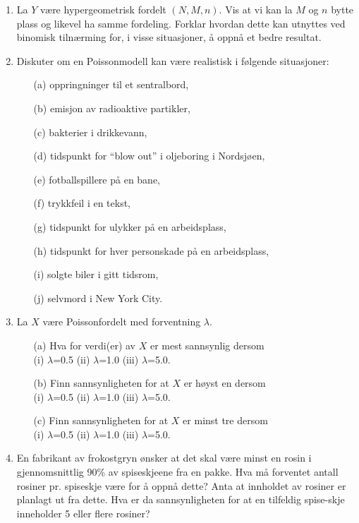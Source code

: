 \begin{enumerate}
\item  La $Y$ være hypergeometrisk fordelt $(N,M,n)$. Vis at vi kan
     la $M$ og $n$ bytte plass og likevel ha samme fordeling.
     Forklar hvordan dette kan utnyttes ved binomisk tilnærming
     for, i visse situasjoner, å oppnå et bedre resultat.


\item  Diskuter om en Poissonmodell kan være realistisk i
     følgende situasjoner:
     \begin{itemize}
     \item[(a)]  oppringninger til et sentralbord,
     \item[(b)]  emisjon av radioaktive partikler,
     \item[(c)]  bakterier i drikkevann,
     \item[(d)]  tidspunkt for ``blow out'' i oljeboring i Nordsjøen,
     \item[(e)]  fotballspillere på en bane,
     \item[(f)]  trykkfeil i en tekst,
     \item[(g)]  tidspunkt for ulykker på en arbeidsplass,
     \item[(h)]  tidspunkt for hver personskade på en arbeidsplass,
     \item[(i)]  solgte biler i gitt tidsrom,
     \item[(j)]  selvmord i New York City.
     \end{itemize}

\item  La $X$ være Poissonfordelt med forventning $\lambda$.
     \begin{itemize}
     \item[(a)]  Hva for verdi(er) av $X$ er mest sannsynlig dersom \\
          (i) $\lambda$=0.5 (ii) $\lambda$=1.0 (iii) $\lambda$=5.0.
     \item[(b)]  Finn sannsynligheten for at $X$ er høyst en dersom \\
          (i) $\lambda$=0.5 (ii) $\lambda$=1.0 (iii) $\lambda$=5.0.
     \item[(c)]  Finn sannsynligheten for at $X$ er minst tre dersom \\
          (i) $\lambda$=0.5 (ii) $\lambda$=1.0 (iii) $\lambda$=5.0.
     \end{itemize}

\item En fabrikant av frokostgryn ønsker at det skal være minst en
      rosin i gjennomsnittlig 90\% av spiseskjeene fra en pakke. Hva må
    forventet antall rosiner pr. spiseskje være for å oppnå dette? 
    Anta at innholdet av rosiner er planlagt ut fra dette. Hva er da
      sannsynligheten for at en tilfeldig spise-skje inneholder 5 eller flere
      rosiner?


\end{enumerate}

